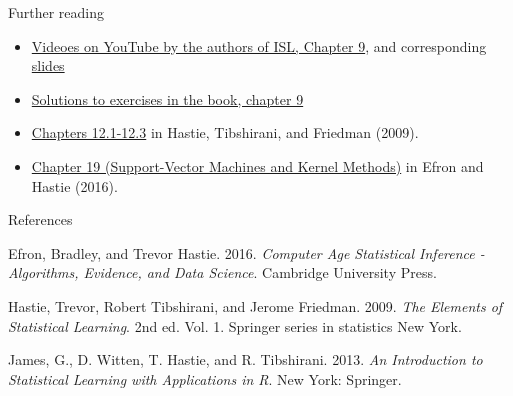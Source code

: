 \documentclass[10pt,ignorenonframetext,]{beamer}
\begin{document}
\begin{frame}{Further reading}
\protect\hypertarget{further-reading}{}

\begin{itemize}
\item
  \href{https://www.youtube.com/playlist?list=PL5-da3qGB5IDl6MkmovVdZwyYOhpCxo5o}{Videoes
  on YouTube by the authors of ISL, Chapter 9}, and corresponding
  \href{https://lagunita.stanford.edu/c4x/HumanitiesScience/StatLearning/asset/svm.pdf}{slides}
\item
  \href{https://rpubs.com/ppaquay/65566}{Solutions to exercises in the
  book, chapter 9}
\item
  \href{https://web.stanford.edu/~hastie/ElemStatLearn}{Chapters
  12.1-12.3} in Hastie, Tibshirani, and Friedman (2009).
\item
  \href{https://web.stanford.edu/~hastie/CASI/}{Chapter 19
  (Support-Vector Machines and Kernel Methods)} in Efron and Hastie
  (2016).
\end{itemize}

\end{frame}

\begin{frame}{References}
\protect\hypertarget{references}{}

\hypertarget{refs}{}
\leavevmode\hypertarget{ref-casi}{}%
Efron, Bradley, and Trevor Hastie. 2016. \emph{Computer Age Statistical
Inference - Algorithms, Evidence, and Data Science}. Cambridge
University Press.

\leavevmode\hypertarget{ref-ESL}{}%
Hastie, Trevor, Robert Tibshirani, and Jerome Friedman. 2009. \emph{The
Elements of Statistical Learning}. 2nd ed. Vol. 1. Springer series in
statistics New York.

\leavevmode\hypertarget{ref-james.etal}{}%
James, G., D. Witten, T. Hastie, and R. Tibshirani. 2013. \emph{An
Introduction to Statistical Learning with Applications in R}. New York:
Springer.

\end{frame}
\end{document}

